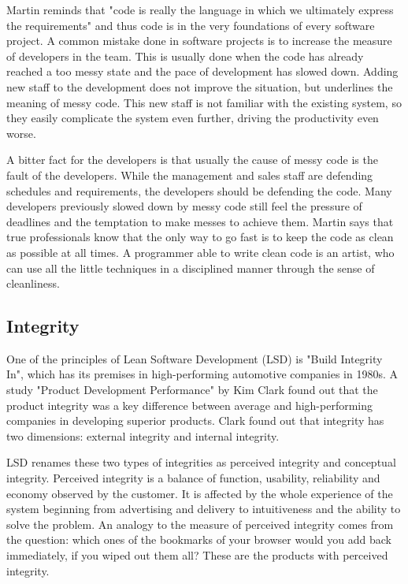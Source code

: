  Martin reminds that "code is really the language in which we ultimately express the requirements" and thus code is in the very foundations of every software project. A common mistake done in software projects is to increase the measure of developers in the team. This is usually done when the code has already reached a too messy state and the pace of development has slowed down. Adding new staff to the development does not improve the situation, but underlines the meaning of messy code. This new staff is not familiar with the existing system, so they easily complicate the system even further, driving the productivity even worse.

 A bitter fact for the developers is that usually the cause of messy code is the fault of the developers. While the management and sales staff are defending schedules and requirements, the developers should be defending the code. Many developers previously slowed down by messy code still feel the pressure of deadlines and the temptation to make messes to achieve them. Martin says that true professionals know that the only way to go fast is to keep the code as clean as possible at all times. A programmer able to write clean code is an artist, who can use all the little techniques in a disciplined manner through the sense of cleanliness.~\cite{martin2008clean}
 
 \subsection{Integrity} 

 One of the principles of Lean Software Development (LSD) is "Build Integrity In", which has its premises in high-performing automotive companies in 1980s. A study "Product Development Performance" by Kim Clark found out that the product integrity was a key difference between average and high-performing companies in developing superior products. Clark found out that integrity has two dimensions: external integrity and internal integrity.~\cite{clark1991product}

 LSD renames these two types of integrities as perceived integrity and conceptual integrity. Perceived integrity is a balance of function, usability, reliability and economy observed by the customer. It is affected by the whole experience of the system beginning from advertising and delivery to intuitiveness and the ability to solve the problem. An analogy to the measure of perceived integrity comes from the question: which ones of the bookmarks of your browser would you add back immediately, if you wiped out them all? These are the products with perceived integrity. 

